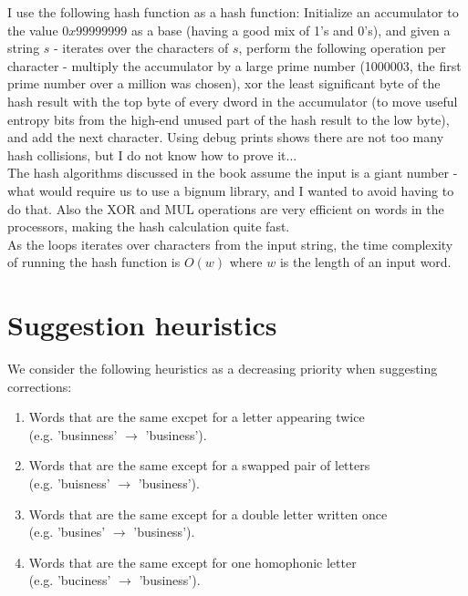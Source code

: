 \documentclass[a4paper]{article}
\begin{document}
I use the following hash function as a hash function: Initialize an accumulator to the value $0x99999999$ as a base (having a good mix of 1's and 0's), and given a string $s$ - iterates over the characters of $s$, perform the following operation per character - multiply the accumulator by a large prime number (1000003, the first prime number over a million was chosen), xor the least significant byte of the hash result with the top byte of every dword in the accumulator (to move useful entropy bits from the high-end unused part of the hash result to the low byte), and add the next character. Using debug prints shows there are not too many hash collisions, but I do not know how to prove it...\\

The hash algorithms discussed in the book assume the input is a giant number - what would require us to use a bignum library, and I wanted to avoid having to do that. Also the XOR and MUL operations are very efficient on words in the processors, making the hash calculation quite fast.\\

As the loops iterates over characters from the input string, the time complexity of running the hash function is $O(w)$ where $w$ is the length of an input word.

\section{Suggestion heuristics}

We consider the following heuristics as a decreasing priority when suggesting corrections:
\begin{enumerate}
	\item Words that are the same excpet for a letter appearing twice\\(e.g. 'businness' $\rightarrow$ 'business').
	\item Words that are the same except for a swapped pair of letters\\(e.g. 'buisness' $\rightarrow$ 'business').
	\item Words that are the same except for a double letter written once\\(e.g. 'busines' $\rightarrow$ 'business').
	\item Words that are the same except for one homophonic letter\\(e.g. 'buciness' $\rightarrow$ 'business').
\end{enumerate}
\end{document}
